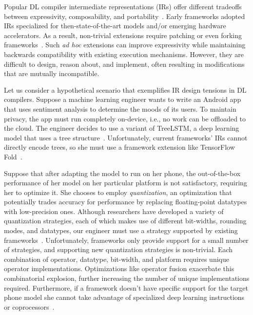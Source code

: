 Popular DL compiler intermediate representations (IRs) offer different tradeoffs
  between expressivity, composability, and portability~\cite{
    tensorflow, pytorch_ad, chainer_learningsys2015, tangent, theano, glow}.
Early frameworks adopted IRs
  specialized for then-state-of-the-art models and/or
  emerging hardware accelerators.
As a result, non-trivial extensions require
  patching or even forking frameworks~\cite{
    tf_fold, tf_lite, tangent, tf_eager, xla, glow, torchscript}.
Such \textit{ad hoc} extensions can improve expressivity
  while maintaining backwards compatibility with existing execution mechanisms.
However, they are difficult to design, reason about, and implement,
  often resulting in modifications that are mutually incompatible.

Let us consider a hypothetical scenario that exemplifies
  IR design tensions in DL compilers.
Suppose a machine learning engineer wants to write
  an Android app that uses sentiment analysis to
  determine the moods of its users.
To maintain privacy, the app must run completely on-device,
  i.e., no work can be offloaded to the cloud.
The engineer decides to use a variant of TreeLSTM,
  a deep learning model that uses a tree structure~\cite{tree_lstm}.
Unfortunately, current frameworks' IRs cannot directly encode trees,
  so she must use a framework extension
  like TensorFlow Fold~\cite{tensorflowfold}.

Suppose that after adapting the model to run on her phone,
  the out-of-the-box performance of her
  model on her particular platform is not satisfactory, requiring her to optimize it.
She chooses to employ \textit{quantization}, an optimization that
  potentially trades accuracy for performance by replacing
  floating-point datatypes with low-precision ones.
Although researchers have developed a variety of quantization
  strategies, each of which makes use of different bit-widths, rounding
  modes, and datatypes, our engineer must use a strategy supported
  by existing frameworks~\cite{gustafson2015end, tf_lite_ops_compat, glow_quant}.
Unfortunately, frameworks only provide support for a small number
  of strategies, and supporting new quantization strategies is non-trivial.
Each combination of operator, datatype, bit-width, and
  platform requires unique operator implementations.
Optimizations like operator fusion exacerbate this combinatorial explosion,
  further increasing
  the number of unique implementations required.
Furthermore, if a framework doesn't have specific support for
  the target phone model she cannot take advantage of specialized deep learning
  instructions or coprocessors~\cite{apple_neural_engine}.

